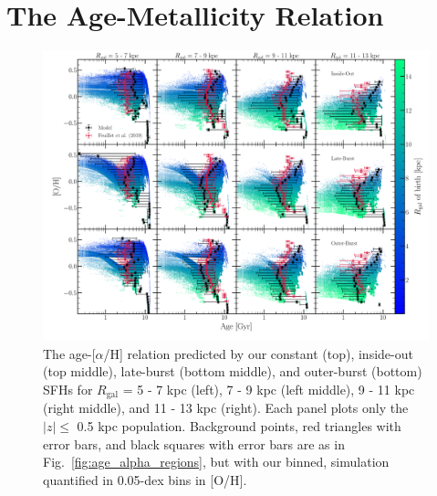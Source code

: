 \documentclass[a4paper, fleqn, usenatbib, useAMS]{mnras}
\begin{document}
\section{The Age-Metallicity Relation} 
\label{sec:amr} 

\begin{figure} 
\centering 
\includegraphics[scale = 0.32]{age_oh_comparison.pdf} 
\caption{The age-[$\alpha$/H] relation predicted by our constant (top), 
inside-out (top middle), late-burst (bottom middle), and outer-burst (bottom) 
SFHs for $R_\text{gal}$ = 5 - 7 kpc (left), 7 - 9 kpc (left middle), 9 - 11 
kpc (right middle), and 11 - 13 kpc (right). Each panel plots only the 
$\left|z\right|\leq$ 0.5 kpc population. Background points, red triangles with 
error bars, and black squares with error bars are as in 
Fig.~\ref{fig:age_alpha_regions}, but with our binned, simulation quantified 
in 0.05-dex bins in [O/H]. } 
\label{fig:age_oh_comparison}
\end{figure} 
\end{document}
